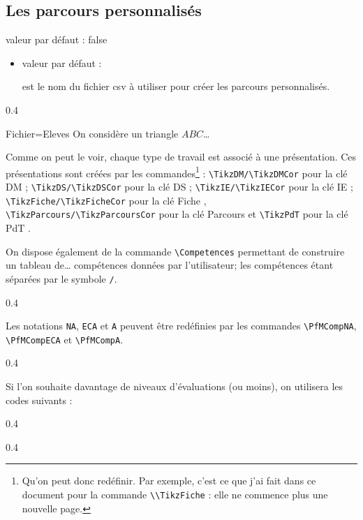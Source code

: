 \documentclass[12pt,french]{article}
\newcommand\Cle[1]{%
  {\sffamily\textlangle #1\textrangle}%
}%
\newcommand{\Defaut}[1]{%
\hfill valeur par défaut : {\sffamily #1}\par%
}%
\newenvironment{Description}
               {\list{}{\labelwidth0pt \leftmargin0pt \itemindent-\leftmargin
                        \let\makelabel\Descriptionlabel}}
               {\endlist}
\newcommand*\Descriptionlabel[1]{\hspace\labelsep
                                \normalfont\bfseries #1}
\renewcommand\TikzDM{%
  \begin{tcolorbox}[frame hidden,colback=white,enhanced,%
    borderline north={3pt}{0pt}{gray!85},
    borderline north={2pt}{0.5pt}{gray!15},
    borderline south={3pt}{0pt}{gray!85},
    borderline south={2pt}{0.5pt}{gray!15},
    ]%
    \sffamily Devoir en temps libre \no\useKV[DM]{Numero}\hfill\useKV[DM]{Niveau}\ieme{} \useKV[DM]{Classe}%
    \par{\tiny\jobname}\hfill{\scriptsize Pour le \useKV[DM]{Date}}%
  \end{tcolorbox}%
}
\renewcommand\TikzDS{%
  \begin{tcolorbox}[colback=gray!5,%
    enhanced,%
    overlay unbroken and first={%
      \node[yshift=1em] at (frame.south) {\scriptsize\sffamily-- Calculatrice \ifboolKV[DS]{Calculatrice}{autorisée}{interdite} --};
    }
    ]%
    \sffamily Devoir surveillé \no\useKV[DS]{Numero} (Sujet \useKV[DS]{Sujet})\hfill\useKV[DS]{Niveau}\ieme{} \useKV[DS]{Classe}
    \par{\tiny\jobname}\hfill{\scriptsize\useKV[DS]{Date}}
  \end{tcolorbox}%
}
\renewcommand\TikzIE{%
  \begin{minipage}{0.6\linewidth}
    \begin{tcolorbox}[colback=gray!5,
      enhanced,%
      overlay unbroken and first={%
        \node[yshift=1em] at (frame.south) {\scriptsize\sffamily-- Calculatrice \ifboolKV[IE]{Calculatrice}{autorisée}{interdite} --};
      }
      ]%
      \sffamily \useKV[IE]{Nom} \no\useKV[IE]{Numero} : \useKV[IE]{Theme} \ifboolKV[IE]{Sujets}{\scriptsize(Sujet \useKV[IE]{NumSujet})}{}
      \vspace{1em}
      \par{\tiny\jobname}\hfill{\scriptsize\useKV[DS]{Date}}
    \end{tcolorbox}%
  \end{minipage}\hfill\begin{minipage}{0.35\linewidth}
    Nom : \dotfill\\[0.5em]
    Prénom : \dotfill\\[0.5em]
    Classe : \dotfill
  \end{minipage}
  \par\bigskip
}
\renewcommand\TikzFiche{%
  \begin{tcolorbox}[%
    colback=gray!5]%
  \Large\sffamily \useKV[Fiche]{Theme}\hfill\useKV[Fiche]{Niveau}\ieme{} \useKV[Fiche]{Classe}
  \par{\tiny\jobname}\hfill{\scriptsize\useKV[Fiche]{Date}}
  \end{tcolorbox}%
}
\renewcommand\TikzParcours{%
  \begin{tcolorbox}[%
    colback=gray!5]%
    \Large\sffamily \useKV[Parcours]{Theme}\hfill\useKV[Parcours]{Niveau} \useKV[Parcours]{Classe}%
    \par{\tiny\useKV[Parcours]{Code}}\hfill{\scriptsize\useKV[Parcours]{Date}}%
  \end{tcolorbox}%
}
\renewcommand\TikzPdT{%
  \begin{tcolorbox}[%
    colback=gray!5]%
    \Large\sffamily \useKV[PdT]{Theme}\hfill\useKV[PdT]{Niveau} \useKV[PdT]{Classe}%
    \par{\tiny\useKV[PdT]{Code}}\hfill{\scriptsize\useKV[PdT]{Date}}%
  \end{tcolorbox}%
}
\begin{document}
\subsection*{Les parcours personnalisés}
\begin{CadreMP}
  \begin{Description}
\item[La clé \Cle{ParcoursPerso}]\Defaut{false}
  \begin{itemize}
  \item[La clé \Cle{Fichier}]\Defaut{}\par est le nom du fichier {\ttfamily csv} à utiliser pour créer les parcours personnalisés.
  \end{itemize}
\end{Description}
\end{CadreMP}
\begin{Codes}{0.4}{}
\begin{Maquette}[ParcoursPerso]{Fichier=Eleves}
  On considère un triangle $ABC$\dots
\end{Maquette}
\end{Codes}
\clearpage
Comme on peut le voir, chaque type de travail est associé à une présentation. Ces présentations sont créées par les commandes\footnote{Qu'on peut donc redéfinir. Par exemple, c'est ce que j'ai fait dans ce document pour la commande \lstinline!\\TikzFiche! : elle ne commence plus une nouvelle page.} : \lstinline!\TikzDM/\TikzDMCor! pour la clé \Cle{DM}; \lstinline!\TikzDS/\TikzDSCor! pour la clé \Cle{DS}; \lstinline!\TikzIE/\TikzIECor! pour la clé \Cle{IE}; \lstinline!\TikzFiche/\TikzFicheCor! pour la clé \Cle{Fiche}, \lstinline!\TikzParcours/\TikzParcoursCor! pour la clé \Cle{Parcours} et \lstinline!\TikzPdT! pour la clé \Cle{PdT}.

On dispose également de la commande \lstinline!\Competences! permettant de construire un tableau de\dots{} compétences données par l'utilisateur; les compétences étant séparées par le symbole \lstinline!/!.
\begin{Codes}[]{0.4}{}
\end{Codes}
Les notations \lstinline!NA!, \lstinline!ECA! et \lstinline!A! peuvent être redéfinies par les commandes \lstinline!\PfMCompNA!, \lstinline!\PfMCompECA! et \lstinline!\PfMCompA!.
\begin{Codes}[]{0.4}{}
\renewcommand\PfMCompNA{\rule{0pt}{3ex}\RKangry}
\renewcommand\PfMCompECA{\RKsad}
\renewcommand\PfMCompA{\RKbigsmile}
\end{Codes}
Si l'on souhaite davantage de niveaux d'évaluations (ou moins), on utilisera les codes suivants :
\begin{Codes}[]{0.4}{}
\end{Codes}
\begin{Codes}[]{0.4}{}
\end{Codes}
\clearpage
\end{document}
